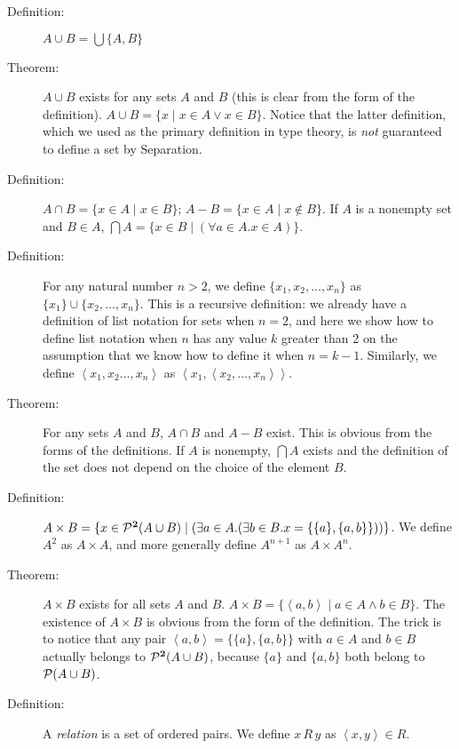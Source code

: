 \documentclass[12pt]{book}
\begin{document}
\begin{description}

\item[Definition:]  $A \cup B = \bigcup\{A,B\}$

\item[Theorem:] $A \cup B$ exists for any sets $A$ and $B$ (this is
clear from the form of the definition).  $A \cup B = \{x \mid x\in A
\vee x \in B\}$.  Notice that the latter definition, which we used as
the primary definition in type theory, is {\em not\/} guaranteed to
define a set by Separation.

\item[Definition:] $A \cap B = \{x \in A\mid x \in B\}$; $A - B = \{x
\in A \mid x \not\in B\}$.  If $A$ is a nonempty set and $B \in A$, $\bigcap A
= \{x \in B \mid (\forall a \in A.x \in A)\}$.

\item[Definition:]  For any natural number $n>2$, we define $\{x_1,x_2,\ldots,x_n\}$ as $\{x_1\} \cup \{x_2,\ldots,x_n\}$.  This is a recursive definition:  we already have a definition of list notation for sets when $n=2$, and here we show how to define list notation when $n$ has any value $k$ greater than 2 on the assumption that we know how to define it when $n=k-1$.  Similarly, we define $\left<x_1,x_2\ldots,x_n\right>$ as $\left<x_1,\left<x_2,\ldots,x_n\right>\right>$.

\item[Theorem:] For any sets $A$ and $B$, $A \cap B$ and $A - B$
exist.  This is obvious from the forms of the definitions.  If $A$ is
nonempty, $\bigcap A$ exists and the definition of the set does not
depend on the choice of the element $B$.

\item[Definition:] $A \times B = \{x \in {\cal P}^{\bf 2}(A \cup B)\mid (\exists
a \in A.(\exists b \in B.x = \{\{a\},\{a,b\}\}))\}$.  We define $A^2$ as $A \times A$, and more generally define $A^{n+1}$ as $A \times A^n$.

\item[Theorem:] $A \times B$ exists for all sets $A$ and $B$.  $A
\times B = \{\left<a,b\right>\mid a \in A \wedge b \in B\}$.  The
existence of $A \times B$ is obvious from the form of the definition.
The trick is to notice that any pair
$\left<a,b\right>=\{\{a\},\{a,b\}\}$ with $a \in A$ and $b \in B$
actually belongs to ${\cal P}^{\bf 2}(A \cup B)$, because $\{a\}$ and
$\{a,b\}$ both belong to ${\cal P}(A \cup B)$.

\item[Definition:] A {\em relation\/} is a set of ordered pairs.  We
define $x\,R\,y$ as $\left<x,y\right> \in R$.


\end{description}
\end{document}
